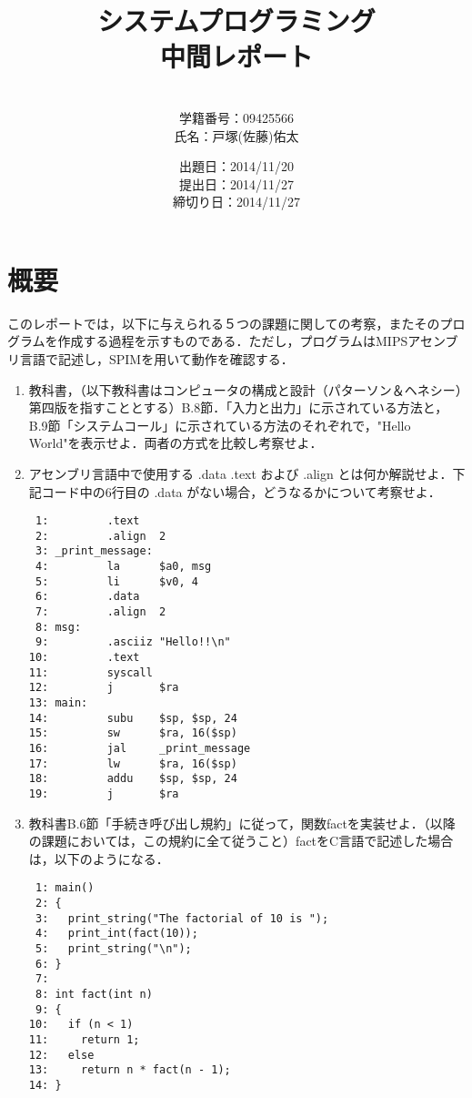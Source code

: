 \documentclass[a4j]{jarticle}
\title{システムプログラミング\\中間レポート}
\author{\\学籍番号：09425566\\氏名：戸塚(佐藤)佑太}
\date{出題日：2014/11/20\\提出日：2014/11/27\\締切り日：2014/11/27\\}
\begin{document}
\maketitle

\newpage



%
%

\section{概要}

このレポートでは，以下に与えられる５つの課題に関しての考察，またそのプログラムを作成する過程を示すものである．ただし，プログラムはMIPSアセンブリ言語で記述し，SPIMを用いて動作を確認する．


\begin{enumerate}

\item 教科書，（以下教科書はコンピュータの構成と設計（パターソン＆ヘネシー）第四版を指すこととする）B.8節．「入力と出力」に示されている方法と，B.9節「システムコール」に示されている方法のそれぞれで，"Hello World"を表示せよ．両者の方式を比較し考察せよ．


\item アセンブリ言語中で使用する .data  .text および .align とは何か解説せよ．下記コード中の6行目の .data がない場合，どうなるかについて考察せよ．

{\baselineskip 3mm
\begin{verbatim}
 1:         .text
 2:         .align  2
 3: _print_message:
 4:         la      $a0, msg
 5:         li      $v0, 4
 6:         .data
 7:         .align  2
 8: msg:
 9:         .asciiz "Hello!!\n"
10:         .text
11:         syscall
12:         j       $ra
13: main:
14:         subu    $sp, $sp, 24
15:         sw      $ra, 16($sp)
16:         jal     _print_message
17:         lw      $ra, 16($sp)
18:         addu    $sp, $sp, 24
19:         j       $ra
\end{verbatim}
}

\item 教科書B.6節「手続き呼び出し規約」に従って，関数factを実装せよ．（以降の課題においては，この規約に全て従うこと）factをC言語で記述した場合は，以下のようになる．

{\baselineskip 3mm
\begin{verbatim}
 1: main()
 2: {
 3:   print_string("The factorial of 10 is ");
 4:   print_int(fact(10));
 5:   print_string("\n");
 6: }
 7: 
 8: int fact(int n)
 9: {
10:   if (n < 1)
11:     return 1;
12:   else
13:     return n * fact(n - 1);
14: }
\end{verbatim}
}


\end{enumerate}
\end{document}
